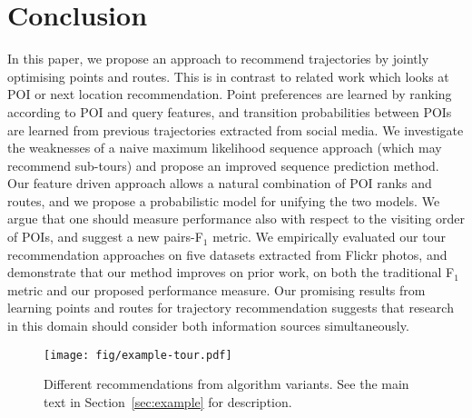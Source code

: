 \section{Conclusion}
\label{sec:conclusion}

In this paper, we propose an approach to recommend trajectories
by jointly optimising points and routes.
This is in contrast to related work which looks at POI %
or next location recommendation.
Point preferences are learned by ranking according to POI and query features,
and transition probabilities between POIs are learned from previous trajectories extracted
from social media.
We investigate the weaknesses of a naive maximum likelihood sequence approach (which
may recommend sub-tours) and propose an improved sequence prediction method.
Our feature driven approach allows a natural combination of POI ranks and routes,
and we propose a probabilistic model for unifying the two models.
We argue that one should measure performance also with respect to the visiting order of POIs, 
and suggest a new pairs-F$_1$ metric.
We empirically evaluated our tour recommendation approaches on five datasets extracted from
Flickr photos, and demonstrate that our method improves on prior work, 
on both the traditional F$_1$ metric and our proposed performance measure.
Our promising results from learning points and routes for trajectory recommendation suggests
that research in this domain should consider both information sources simultaneously.


\begin{figure*}[t]
	\centering
	\texttt{[image: fig/example-tour.pdf]}
	\caption{Different recommendations from algorithm variants.
    See the main text in Section~\ref{sec:example} for description.}
	\label{fig:exampleresult}
	\captionmoveup
\end{figure*}



